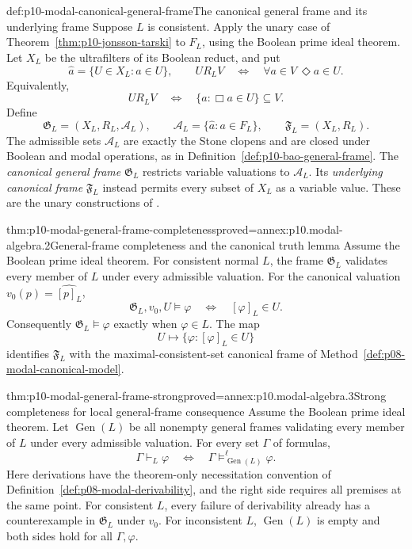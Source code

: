 \begin{hbdefinition}{def:p10-modal-canonical-general-frame}{The canonical general frame and its underlying frame}
Suppose \(L\) is consistent.
Apply the unary case of Theorem~\ref{thm:p10-jonsson-tarski} to
\(F_L\), using the Boolean prime ideal theorem.
Let \(X_L\) be the ultrafilters of its Boolean reduct, and put
\[
 \widehat a=\{U\in X_L:a\in U\},\qquad
 U R_L V
   \quad\Longleftrightarrow\quad
       \forall a\in V\ \Diamond a\in U.
\]
Equivalently,
\[
 U R_L V
   \quad\Longleftrightarrow\quad
       \{a:\Box a\in U\}\subseteq V.
\]
Define
\[
 \mathfrak G_L=(X_L,R_L,\mathcal A_L),\qquad
 \mathcal A_L=\{\widehat a:a\in F_L\},\qquad
 \mathfrak F_L=(X_L,R_L).
\]
The admissible sets \(\mathcal A_L\) are exactly the Stone clopens
and are closed under Boolean and modal operations, as in
Definition~\ref{def:p10-bao-general-frame}.
The \emph{canonical general frame} \(\mathfrak G_L\) restricts
variable valuations to \(\mathcal A_L\).
Its \emph{underlying canonical frame} \(\mathfrak F_L\) instead
permits every subset of \(X_L\) as a variable value.
These are the unary constructions of
\cite[Example~5.13 and Definition~5.24, pp.~20, 22]{Venema2005Preprint}.
\end{hbdefinition}

\begin{hbtheorem}{thm:p10-modal-general-frame-completeness}{proved=annex:p10.modal-algebra.2}{General-frame completeness and the canonical truth lemma}
Assume the Boolean prime ideal theorem.
For consistent normal \(L\), the frame \(\mathfrak G_L\) validates
every member of \(L\) under every admissible valuation.
For the canonical valuation \(v_0(p)=\widehat{[p]_L}\),
\[
 \mathfrak G_L,v_0,U\models\varphi
           \quad\Longleftrightarrow\quad[\varphi]_L\in U.
\]
Consequently \(\mathfrak G_L\models\varphi\) exactly when
\(\varphi\in L\).
The map
\[
 U\longmapsto\{\varphi:[\varphi]_L\in U\}
\]
identifies \(\mathfrak F_L\) with the maximal-consistent-set
canonical frame of Method~\ref{def:p08-modal-canonical-model}.
\end{hbtheorem}

\begin{hbtheorem}{thm:p10-modal-general-frame-strong}{proved=annex:p10.modal-algebra.3}{Strong completeness for local general-frame consequence}
Assume the Boolean prime ideal theorem.
Let \(\operatorname{Gen}(L)\) be all nonempty general frames
validating every member of \(L\) under every admissible valuation.
For every set \(\Gamma\) of formulas,
\[
 \Gamma\vdash_L\varphi
       \quad\Longleftrightarrow\quad
 \Gamma\models^\ell_{\operatorname{Gen}(L)}\varphi.
\]
Here derivations have the theorem-only necessitation convention of
Definition~\ref{def:p08-modal-derivability}, and the right side
requires all premises at the same point.
For consistent \(L\), every failure of derivability already has
a counterexample in \(\mathfrak G_L\) under \(v_0\).
For inconsistent \(L\), \(\operatorname{Gen}(L)\) is empty and
both sides hold for all \(\Gamma,\varphi\).
\end{hbtheorem}

